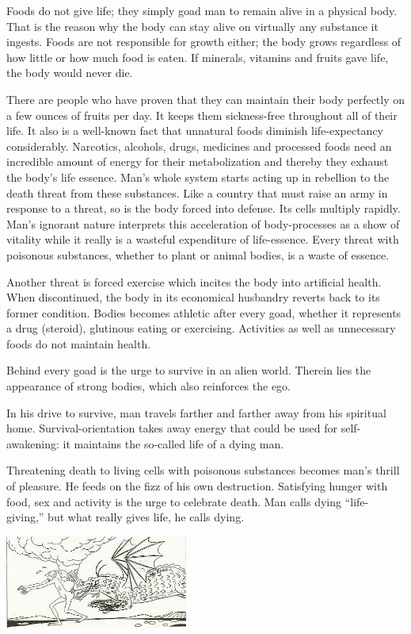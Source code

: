 \documentclass[landscape,twocolumn,letterpaper]{article}
\begin{document}
Foods do not give life; they simply goad man to remain alive in a
physical body. That is the reason why the body can stay alive on
virtually any substance it ingests. Foods are not responsible for
growth either; the body grows regardless of how little or how much
food is eaten. If minerals, vitamins and fruits gave life, the body
would never die.

There are people who have proven that they can maintain their body
perfectly on a few ounces of fruits per day. It keeps them
sickness-free throughout all of their life. It also is a well-known
fact that unnatural foods diminish life-expectancy
considerably. Narcotics, alcohols, drugs, medicines and processed
foods need an incredible amount of energy for their metabolization and
thereby they exhaust the body's life essence. Man's whole system
starts acting up in rebellion to the death threat from these
substances. Like a country that must raise an army in response to a
threat, so is the body forced into defense. Its cells multiply
rapidly. Man's ignorant nature interprets this acceleration of
body-processes as a show of vitality while it really is a wasteful
expenditure of life-essence. Every threat with poisonous substances,
whether to plant or animal bodies, is a waste of essence.

Another threat is forced exercise which incites the body into
artificial health. When discontinued, the body in its economical
husbandry reverts back to its former condition. Bodies becomes
athletic after every goad, whether it represents a drug (steroid),
glutinous eating or exercising. Activities as well as unnecessary
foods do not maintain health.

Behind every goad is the urge to survive in an alien world. Therein
lies the appearance of strong bodies, which also reinforces the ego.

In his drive to survive, man travels farther and farther away from his
spiritual home. Survival-orientation takes away energy that could be
used for self-awakening: it maintains the so-called life of a dying
man.

Threatening death to living cells with poisonous substances becomes
man's thrill of pleasure. He feeds on the fizz of his own
destruction. Satisfying hunger with food, sex and activity is the urge
to celebrate death. Man calls dying ``life-giving,'' but what really
gives life, he calls dying.

\includegraphics[width=0.45\textwidth,bb=0 0 447 227]{p12.jpg}
\end{document}

